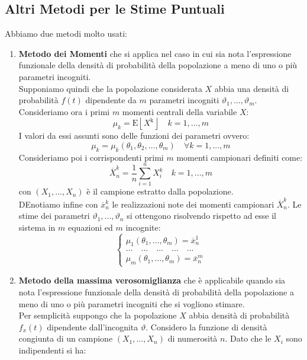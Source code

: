 \documentclass[a4paper,12pt, oneside]{book}
\begin{document}
\subsection{Altri Metodi per le Stime Puntuali}
Abbiamo due metodi molto usati:
\begin{enumerate}
\item \textbf{Metodo dei Momenti} che si applica nel caso in cui sia
  nota l’espressione funzionale della densità di probabilità della popolazione a meno di
  uno o più parametri incogniti.\\
  Supponiamo quindi che la popolazione considerata $X$ abbia una densità di probabilità
  $f(t)$ dipendente da $m$ parametri incogniti $\vartheta_1,..., \vartheta_m$.\\
  Consideriamo ora i primi $m$ momenti centrali della variabile $X$:
  \[\mu_{k}=\mathrm{E}\left\lfloor X^{\mathrm{k}}\right\rfloor \quad k=1, \ldots, m\]
  I valori da essi assunti sono delle funzioni dei parametri ovvero:
  \[\mu_{k}=\mu_{k}\left(\theta_{1}, \theta_{2}, \ldots, \theta_{m}\right) \quad \forall k=1,...,m\]
  Consideriamo poi i corrispondenti primi $m$ momenti campionari definiti come:
  \[\overline{X}_{n}^{k}=\frac{1}{n} \sum_{i=1}^{n} X_{i}^{k} \quad k=1,...,m\]
  con $(X_1,...,X_n)$ è il campione estratto dalla popolazione.\\
  DEnotiamo infine con $\overline{x}_n^{k}$ le realizzazioni note dei momenti campionari $\overline{X}_n^k$. Le stime dei parametri $\vartheta_1,...,\vartheta_n$ si ottengono risolvendo rispetto ad
  esse il sistema in $m$ equazioni ed $m$ incognite:
  \[\begin{cases}
      \mu_{1}\left(\theta_{1}, \ldots, \theta_{m}\right)=\overline{x}_{n}^{1}\\
      ... \quad ... \quad ... \quad ... \quad ...\\
      \mu_{m}\left(\theta_{1}, \ldots, \theta_{m}\right)=\overline{x}_{n}^{m}
    \end{cases}\]
\item \textbf{Metodo della massima verosomiglianza} che è applicabile quando sia nota
  l’espressione funzionale della densità di probabilità della popolazione a meno di uno o più parametri incogniti che si vogliono stimare.\\
  Per semplicità suppongo che la popolazione $X$ abbia densità di probabilità $f_x(t)$
  dipendente dall'incognita $\vartheta$. Considero la funzione di densità
  congiunta di un campione $(X_1,...,X_n)$ di numerosità $n$. Dato che le $X_i$ sono indipendenti si ha:

\end{enumerate}
\end{document}
